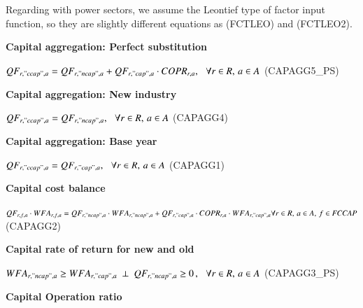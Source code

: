 \documentclass[10pt,a4paper,titlepage,dvipdfmx]{book}
\begin{document}
Regarding with power sectors, we assume the Leontief type of factor input function, so they are slightly different equations as (FCTLEO) and (FCTLEO2).

\begin{flushleft}\textbf{Capital aggregation: Perfect substitution}\end{flushleft}


\begin{center}$QF_{r,"ccap",a}=QF_{r,"ncap",a}+QF_{r,"cap",a}\cdot COPR_{r,a},\,\,\,\,\forall r\in R,\,a\in A$ (CAPAGG5\_PS)
\end{center}

\begin{flushleft}\textbf{Capital aggregation: New industry}\end{flushleft}


\begin{center}$QF_{r,"ccap",a}=QF_{r,"ncap",a},\,\,\,\,\forall r\in R,\,a\in A$ (CAPAGG4)
\end{center}

\begin{flushleft}\textbf{Capital aggregation: Base year }\end{flushleft}


\begin{center}$QF_{r,"ccap",a}=QF_{r,"cap",a},\,\,\,\,\forall r\in R,\,a\in A$ (CAPAGG1)
\end{center}

\begin{flushleft}\textbf{Capital cost balance}\end{flushleft}


\begin{center}$QF_{r,f,a}\cdot WFA_{r,f,a}=QF_{r,"ncap",a}\cdot WFA_{r,"ncap",a}+QF_{r,"cap",a}\cdot COPR_{r,a}\cdot WFA_{r,"cap",a}\forall r\in R,\,a\in A,\,f\in \textit{FCCAP}$   (CAPAGG2)
\end{center}

\begin{flushleft}\textbf{Capital rate of return for new and old}\end{flushleft}


\begin{center}$WFA_{r,"ncap",a}\geq WFA_{r,"cap",a}\,\,\,\bot \,\,\,QF_{r,"ncap",a}\geq 0\,,\,\,\,\,\forall r\in R,\,a\in A$ (CAPAGG3\_PS)
\end{center}

\begin{flushleft}\textbf{Capital Operation ratio}\end{flushleft}
\end{document}

